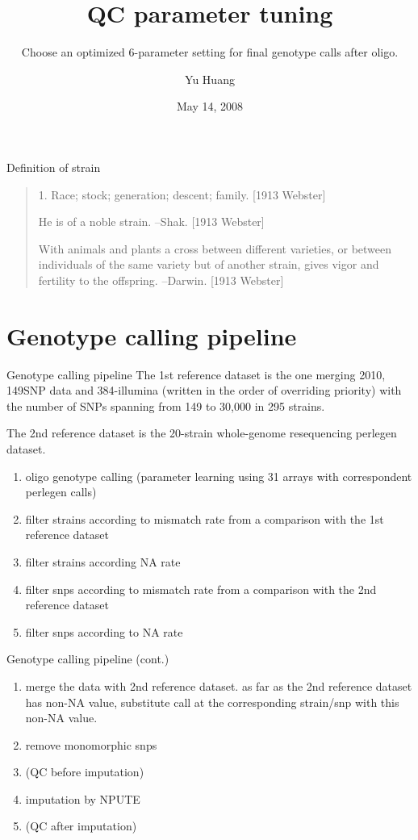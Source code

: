 \documentclass{beamer}
\title{QC parameter tuning}
\subtitle{Choose an optimized 6-parameter setting for final genotype calls after oligo.}
\author{Yu Huang}
\institute{MCB USC}
\date{May 14, 2008}
\begin{document}
{
\begin{beamercolorbox}{}
     \vskip3pt \insertcaption \vskip3pt
  \end{beamercolorbox}
}

\frame{\titlepage}

\begin{frame}{Definition of strain}

\begin{quotation}
 


 1. Race; stock; generation; descent; family.
 [1913 Webster]

 He is of a noble strain. --Shak.
 [1913 Webster]

 With animals and plants a cross between different
 varieties, or between individuals of the same
 variety but of another strain, gives vigor and
 fertility to the offspring. --Darwin.
 [1913 Webster]
\end{quotation}
\end{frame}

\section{Genotype calling pipeline}
\begin{frame}{Genotype calling pipeline}
The 1st reference dataset is the one merging 2010, 149SNP data and 384-illumina (written in the order of overriding priority) with the number of SNPs spanning from 149 to 30,000 in 295 strains.

The 2nd reference dataset is the 20-strain whole-genome resequencing perlegen dataset.

\begin{enumerate}
 \item oligo genotype calling (parameter learning using 31 arrays with correspondent perlegen calls)
 \item filter strains according to mismatch rate from a comparison with the 1st reference dataset
 \item filter strains according NA rate
 \item filter snps according to mismatch rate from a comparison with the 2nd reference dataset
 \item filter snps according to NA rate

\end{enumerate}
\end{frame}

\begin{frame}{Genotype calling pipeline (cont.)}
\begin{enumerate}

 \item merge the data with 2nd reference dataset. as far as the 2nd reference dataset has non-NA value,  substitute call at the corresponding strain/snp with this non-NA value.
 \item remove monomorphic snps
 \item (QC before imputation)
 \item imputation by NPUTE
 \item (QC after imputation)
\end{enumerate}
\end{frame}
\end{document}
